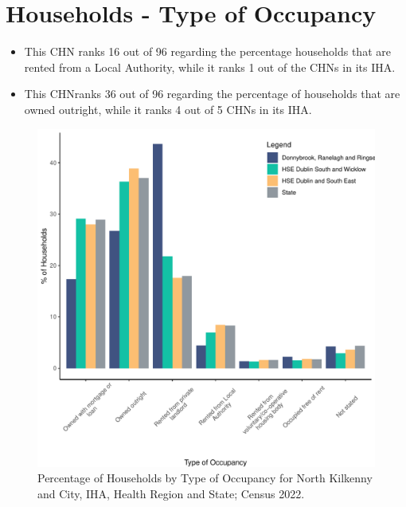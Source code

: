 \documentclass{article}
\begin{document}
\section{Households - Type of Occupancy}\label{sect:Households}
\begin{itemize}
\item This CHN ranks  16 out of 96 regarding the percentage households that are rented from a Local Authority, while it ranks  1 out of the CHNs in its IHA. 
\item This CHNranks  36 out of 96 regarding the percentage of households that are owned outright, while it ranks   4 out of 5 CHNs in its IHA.
\end{itemize}
\begin{figure}[H]
	\centering
	\includegraphics[width = 140mm]{../figures/HouseholdsED.pdf}
	\caption{Percentage of Households by Type of Occupancy for North Kilkenny and City, IHA, Health Region and State; Census 2022.}
	\label{fig:vbnv}
	\end{figure}
\end{document}
